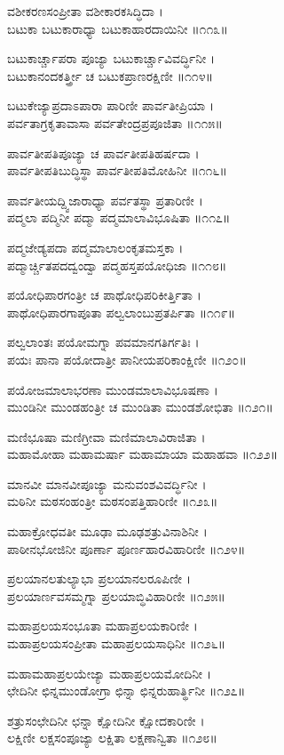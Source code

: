 ವಶೀಕರಣಸಂಪ್ರೀತಾ ವಶೀಕಾರಕಸಿದ್ಧಿದಾ ।\\
ಬಟುಕಾ ಬಟುಕಾರಾಧ್ಯಾ ಬಟುಕಾಹಾರದಾಯಿನೀ ॥೧೧೩॥

ಬಟುಕಾರ್ಚ್ಚಾಪರಾ ಪೂಜ್ಯಾ ಬಟುಕಾರ್ಚ್ಚಾವಿವರ್ದ್ಧಿನೀ ।\\
ಬಟುಕಾನಂದಕರ್ತ್ತ್ರೀ ಚ ಬಟುಕಪ್ರಾಣರಕ್ಷಿಣೀ ॥೧೧೪॥

ಬಟುಕೇಜ್ಯಾಪ್ರದಾಽಪಾರಾ ಪಾರಿಣೀ ಪಾರ್ವತೀಪ್ರಿಯಾ ।\\
ಪರ್ವತಾಗ್ರಕೃತಾವಾಸಾ ಪರ್ವತೇಂದ್ರಪ್ರಪೂಜಿತಾ ॥೧೧೫॥

ಪಾರ್ವತೀಪತಿಪೂಜ್ಯಾ ಚ ಪಾರ್ವತೀಪತಿಹರ್ಷದಾ ।\\
ಪಾರ್ವತೀಪತಿಬುದ್ಧಿಸ್ಥಾ ಪಾರ್ವತೀಪತಿಮೋಹಿನೀ ॥೧೧೬॥

ಪಾರ್ವತೀಯದ್ದ್ವಿಜಾರಾಧ್ಯಾ ಪರ್ವತಸ್ಥಾ ಪ್ರತಾರಿಣೀ ।\\
ಪದ್ಮಲಾ ಪದ್ಮಿನೀ ಪದ್ಮಾ ಪದ್ಮಮಾಲಾವಿಭೂಷಿತಾ ॥೧೧೭॥

ಪದ್ಮಜೇಡ್ಯಪದಾ ಪದ್ಮಮಾಲಾಲಂಕೃತಮಸ್ತಕಾ ।\\
ಪದ್ಮಾರ್ಚ್ಚಿತಪದದ್ವಂದ್ವಾ ಪದ್ಮಹಸ್ತಪಯೋಧಿಜಾ ॥೧೧೮॥

ಪಯೋಧಿಪಾರಗಂತ್ರೀ ಚ ಪಾಥೋಧಿಪರಿಕೀರ್ತ್ತಿತಾ ।\\
ಪಾಥೋಧಿಪಾರಗಾಪೂತಾ ಪಲ್ವಲಾಂಬುಪ್ರತರ್ಪಿತಾ ॥೧೧೯॥

ಪಲ್ವಲಾಂತಃ ಪಯೋಮಗ್ನಾ ಪವಮಾನಗತಿರ್ಗತಿಃ ।\\
ಪಯಃ ಪಾನಾ ಪಯೋದಾತ್ರೀ ಪಾನೀಯಪರಿಕಾಂಕ್ಷಿಣೀ ॥೧೨೦॥

ಪಯೋಜಮಾಲಾಭರಣಾ ಮುಂಡಮಾಲಾವಿಭೂಷಣಾ ।\\
ಮುಂಡಿನೀ ಮುಂಡಹಂತ್ರೀ ಚ ಮುಂಡಿತಾ ಮುಂಡಶೋಭಿತಾ ॥೧೨೧॥

ಮಣಿಭೂಷಾ ಮಣಿಗ್ರೀವಾ ಮಣಿಮಾಲಾವಿರಾಜಿತಾ ।\\
ಮಹಾಮೋಹಾ ಮಹಾಮರ್ಷಾ ಮಹಾಮಾಯಾ ಮಹಾಹವಾ ॥೧೨೨॥

ಮಾನವೀ ಮಾನವೀಪೂಜ್ಯಾ ಮನುವಂಶವಿವರ್ದ್ಧಿನೀ ।\\
ಮಠಿನೀ ಮಠಸಂಹಂತ್ರೀ ಮಠಸಂಪತ್ತಿಹಾರಿಣೀ ॥೧೨೩॥

ಮಹಾಕ್ರೋಧವತೀ ಮೂಢಾ ಮೂಢಶತ್ರುವಿನಾಶಿನೀ ।\\
ಪಾಠೀನಭೋಜಿನೀ ಪೂರ್ಣಾ ಪೂರ್ಣಹಾರವಿಹಾರಿಣೀ ॥೧೨೪॥

ಪ್ರಲಯಾನಲತುಲ್ಯಾಭಾ ಪ್ರಲಯಾನಲರೂಪಿಣೀ ।\\
ಪ್ರಲಯಾರ್ಣವಸಮ್ಮಗ್ನಾ ಪ್ರಲಯಾಬ್ಧಿವಿಹಾರಿಣೀ ॥೧೨೫॥

ಮಹಾಪ್ರಲಯಸಂಭೂತಾ ಮಹಾಪ್ರಲಯಕಾರಿಣೀ ।\\
ಮಹಾಪ್ರಲಯಸಂಪ್ರೀತಾ ಮಹಾಪ್ರಲಯಸಾಧಿನೀ ॥೧೨೬॥

ಮಹಾಮಹಾಪ್ರಲಯೇಜ್ಯಾ ಮಹಾಪ್ರಲಯಮೋದಿನೀ ।\\
ಛೇದಿನೀ ಛಿನ್ನಮುಂಡೋಗ್ರಾ ಛಿನ್ನಾ ಛಿನ್ನರುಹಾರ್ತ್ಥಿನೀ ॥೧೨೭॥

ಶತ್ರುಸಂಛೇದಿನೀ ಛನ್ನಾ ಕ್ಷೋದಿನೀ ಕ್ಷೋದಕಾರಿಣೀ ।\\
ಲಕ್ಷಿಣೀ ಲಕ್ಷಸಂಪೂಜ್ಯಾ ಲಕ್ಷಿತಾ ಲಕ್ಷಣಾನ್ವಿತಾ ॥೧೨೮॥

